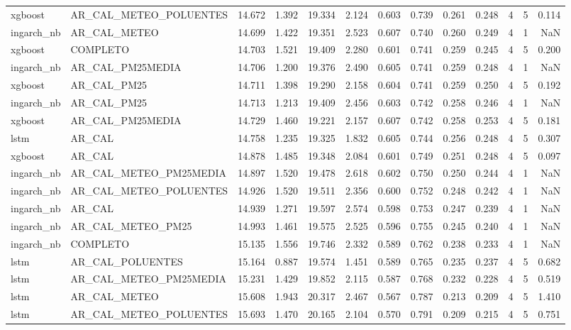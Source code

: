 \begin{tabular}{llrrrrrrrrrrr}
xgboost & AR_CAL_METEO_POLUENTES & 14.672 & 1.392 & 19.334 & 2.124 & 0.603 & 0.739 & 0.261 & 0.248 & 4 & 5 & 0.114 \\
ingarch_nb & AR_CAL_METEO & 14.699 & 1.422 & 19.351 & 2.523 & 0.607 & 0.740 & 0.260 & 0.249 & 4 & 1 & NaN \\
xgboost & COMPLETO & 14.703 & 1.521 & 19.409 & 2.280 & 0.601 & 0.741 & 0.259 & 0.245 & 4 & 5 & 0.200 \\
ingarch_nb & AR_CAL_PM25MEDIA & 14.706 & 1.200 & 19.376 & 2.490 & 0.605 & 0.741 & 0.259 & 0.248 & 4 & 1 & NaN \\
xgboost & AR_CAL_PM25 & 14.711 & 1.398 & 19.290 & 2.158 & 0.604 & 0.741 & 0.259 & 0.250 & 4 & 5 & 0.192 \\
ingarch_nb & AR_CAL_PM25 & 14.713 & 1.213 & 19.409 & 2.456 & 0.603 & 0.742 & 0.258 & 0.246 & 4 & 1 & NaN \\
xgboost & AR_CAL_PM25MEDIA & 14.729 & 1.460 & 19.221 & 2.157 & 0.607 & 0.742 & 0.258 & 0.253 & 4 & 5 & 0.181 \\
lstm & AR_CAL & 14.758 & 1.235 & 19.325 & 1.832 & 0.605 & 0.744 & 0.256 & 0.248 & 4 & 5 & 0.307 \\
xgboost & AR_CAL & 14.878 & 1.485 & 19.348 & 2.084 & 0.601 & 0.749 & 0.251 & 0.248 & 4 & 5 & 0.097 \\
ingarch_nb & AR_CAL_METEO_PM25MEDIA & 14.897 & 1.520 & 19.478 & 2.618 & 0.602 & 0.750 & 0.250 & 0.244 & 4 & 1 & NaN \\
ingarch_nb & AR_CAL_METEO_POLUENTES & 14.926 & 1.520 & 19.511 & 2.356 & 0.600 & 0.752 & 0.248 & 0.242 & 4 & 1 & NaN \\
ingarch_nb & AR_CAL & 14.939 & 1.271 & 19.597 & 2.574 & 0.598 & 0.753 & 0.247 & 0.239 & 4 & 1 & NaN \\
ingarch_nb & AR_CAL_METEO_PM25 & 14.993 & 1.461 & 19.575 & 2.525 & 0.596 & 0.755 & 0.245 & 0.240 & 4 & 1 & NaN \\
ingarch_nb & COMPLETO & 15.135 & 1.556 & 19.746 & 2.332 & 0.589 & 0.762 & 0.238 & 0.233 & 4 & 1 & NaN \\
lstm & AR_CAL_POLUENTES & 15.164 & 0.887 & 19.574 & 1.451 & 0.589 & 0.765 & 0.235 & 0.237 & 4 & 5 & 0.682 \\
lstm & AR_CAL_METEO_PM25MEDIA & 15.231 & 1.429 & 19.852 & 2.115 & 0.587 & 0.768 & 0.232 & 0.228 & 4 & 5 & 0.519 \\
lstm & AR_CAL_METEO & 15.608 & 1.943 & 20.317 & 2.467 & 0.567 & 0.787 & 0.213 & 0.209 & 4 & 5 & 1.410 \\
lstm & AR_CAL_METEO_POLUENTES & 15.693 & 1.470 & 20.165 & 2.104 & 0.570 & 0.791 & 0.209 & 0.215 & 4 & 5 & 0.751 \\

\end{tabular}
